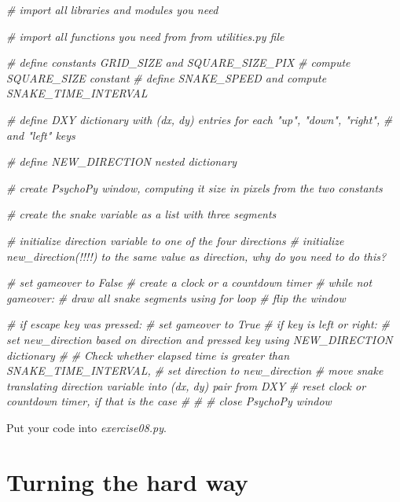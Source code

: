 \documentclass[
]{book}
\newenvironment{Shaded}{\begin{snugshade}}{\end{snugshade}}
\newcommand{\CommentTok}[1]{\textcolor[rgb]{0.56,0.35,0.01}{\textit{#1}}}
\begin{document}
\begin{Shaded}
\begin{Highlighting}[]
\CommentTok{\# import all libraries and modules you need}

\CommentTok{\# import all functions you need from from utilities.py file}

\CommentTok{\# define constants GRID\_SIZE and SQUARE\_SIZE\_PIX}
\CommentTok{\# compute SQUARE\_SIZE constant}
\CommentTok{\# define SNAKE\_SPEED and compute SNAKE\_TIME\_INTERVAL}

\CommentTok{\# define DXY dictionary with (dx, dy) entries for each "up", "down", "right",}
\CommentTok{\#     and "left" keys}

\CommentTok{\# define NEW\_DIRECTION nested dictionary}

\CommentTok{\# create PsychoPy window, computing it size in pixels from the two constants}

\CommentTok{\# create the snake variable as a list with three segments}

\CommentTok{\# initialize direction variable to one of the four directions}
\CommentTok{\# initialize new\_direction(!!!!) to the same value as direction, why do you need to do this?}

\CommentTok{\# set gameover to False}
\CommentTok{\# create a clock or a countdown timer}
\CommentTok{\# while not gameover:}
\CommentTok{\#     draw all snake segments using for loop  }
\CommentTok{\#     flip the window}

\CommentTok{\#     if escape key was pressed:}
\CommentTok{\#         set gameover to True}
\CommentTok{\#     if key is left or right:}
\CommentTok{\#         set new\_direction based on direction and pressed key using NEW\_DIRECTION dictionary }
\CommentTok{\#}
\CommentTok{\#     Check whether elapsed time is greater than SNAKE\_TIME\_INTERVAL, }
\CommentTok{\#         set direction to new\_direction}
\CommentTok{\#         move snake translating direction variable into (dx, dy) pair from DXY}
\CommentTok{\#         reset clock or countdown timer, if that is the case}
\CommentTok{\#}
\CommentTok{\#}
\CommentTok{\# close PsychoPy window}
\end{Highlighting}
\end{Shaded}

Put your code into \emph{exercise08.py}.

\hypertarget{turning-the-hard-way}{%
\section{Turning the hard way}\label{turning-the-hard-way}}
\end{document}
